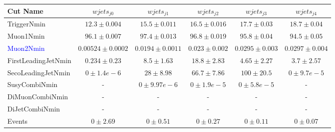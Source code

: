 \documentclass{beamer}
\begin{document}
\begin{frame}
 
 \begin{table}[htbp]
\tiny{
\begin{center}
\begin{tabular}{lccccc}\hline\hline
      Cut Name &      $wjets_{j0}$ &            $wjets_{j1}$  &          $wjets_{j2}$ &            $wjets_{j3}$ &          $wjets_{j4}$ \\  
 \hline    
 TriggerNmin  &  $12.3 \pm 0.004$ &    $15.5 \pm 0.011$ &    $16.5 \pm 0.016$ &    $17.7 \pm 0.03$ &    $18.7 \pm 0.04$ \\ 
 Muon1Nmin &     $96.1 \pm 0.007$ &     $97.4 \pm 0.013$ &     $96.8 \pm 0.019$ &     $95.8 \pm 0.04$ &     $94.5 \pm 0.05$ \\  
 \textcolor{blue}{Muon2Nmin}  &     $0.00524 \pm 0.0002$ &     $0.0194 \pm 0.0011$ &     $0.023 \pm 0.002$ &     $0.0295 \pm 0.003$ &     $0.0297 \pm 0.004$ \\  
 FirstLeadingJetNmin &     $0.234 \pm 0.23$ &     $8.5 \pm  1.63$ &     $18.8 \pm  2.83$ &     $4.65 \pm  2.27$ &     $3.7 \pm  2.57$ \\  
 SecoLeadingJetNmin &     $0 \pm 1.4e-6$ &     $28 \pm  8.98$ &     $66.7 \pm  7.86$ &     $100 \pm  20.5$ &     $0 \pm 9.7e-5$ \\  
 SusyCombiNmin             &            -&     $0 \pm 9.97e-6$ &     $0 \pm 1.9e-5$ &     $0 \pm 5.8e-5$ &     - \\  
 DiMuonCombiNmin         &          - &      - &     - &     - &     - \\  
 DiJetCombiNmin              &         - &      - &     - &     - &     - \\  
\hline
Events  &  $0 \pm  2.69$ &         $0 \pm  0.51$ &         $0 \pm  0.27$ &         $0 \pm  0.11$ &         $0 \pm  0.07$ \\
\hline \hline
\end{tabular}
\end{center}
}
\end{table}

 
 
 \end{frame}
 
\end{document}
